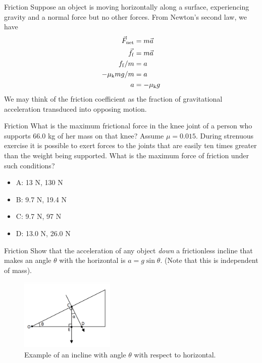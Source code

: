 \documentclass{beamer}
\begin{document}
\begin{frame}{Friction}
Suppose an object is moving horizontally along a surface, experiencing gravity and a normal force but no other forces.  From Newton's second law, we have \\
\begin{align}
\vec{F}_{\rm net} &= m \vec{a} \\
\vec{f}_{\rm f} &= m\vec{a} \\
f_{\rm f}/m &= a \\
-\mu_{\rm k} m g / m &= a \\
a &= -\mu_{\rm k} g
\end{align}
We may think of the friction coefficient as the fraction of gravitational acceleration transduced into opposing motion.
\end{frame}

\begin{frame}{Friction}
What is the maximum frictional force in the knee joint of a person who supports 66.0 kg of her mass on that knee?  Assume $\mu = 0.015$.  During strenuous exercise it is possible to exert forces to the joints that are easily ten times greater than the weight being supported. What is the maximum force of friction under such conditions?
\begin{itemize}
\item A: 13 N, 130 N
\item B: 9.7 N, 19.4 N
\item C: 9.7 N, 97 N
\item D: 13.0 N, 26.0 N
\end{itemize}
\end{frame}

\begin{frame}{Friction}
Show that the acceleration of any object \textit{down} a frictionless incline that makes an angle $\theta$ with the horizontal is $a = g\sin\theta$.  (Note that this is independent of mass).
\begin{figure}
\centering
\includegraphics[width=0.4\textwidth]{figures/incline.png}
\caption{\label{fig:incline} Example of an incline with angle $\theta$ with respect to horizontal.}
\end{figure}
\end{frame}
\end{document}
